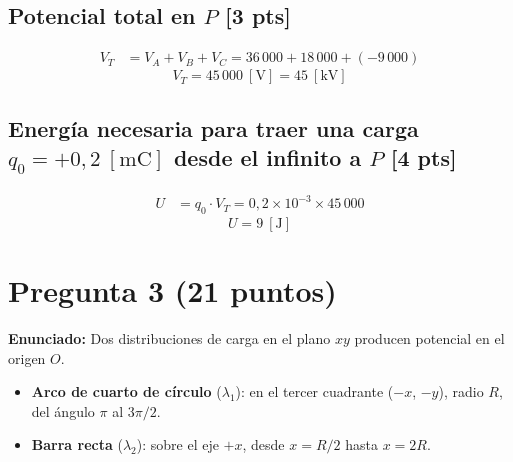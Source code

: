 \documentclass[12pt,letterpaper]{article}
\begin{document}
\subsection*{Potencial total en $P$ \hfill \normalfont\small[3 pts]}

\begin{align*}
    V_T &= V_A + V_B + V_C = 36\,000 + 18\,000 + (-9\,000)
\end{align*}
\[
    \boxed{V_T = 45\,000\ [\text{V}] = 45\ [\text{kV}]}
\]

\subsection*{Energ\'ia necesaria para traer una carga $q_0 = +0{,}2\ [\text{mC}]$ desde el infinito a $P$ \hfill \normalfont\small[4 pts]}

\begin{align*}
    U &= q_0\cdot V_T
      = 0{,}2\times10^{-3}\times 45\,000
\end{align*}
\[
    \boxed{U = 9\ [\text{J}]}
\]

\newpage

\section*{Pregunta 3 \hfill \normalfont\small(21 puntos)}

\noindent\textbf{Enunciado:} Dos distribuciones de carga en el plano $xy$ producen potencial en el origen $O$.

\begin{itemize}
    \item \textbf{Arco de cuarto de c\'irculo} ($\lambda_1$): en el tercer cuadrante ($-x$, $-y$), radio $R$, del \'angulo $\pi$ al $3\pi/2$.
    \item \textbf{Barra recta} ($\lambda_2$): sobre el eje $+x$, desde $x = R/2$ hasta $x = 2R$.
\end{itemize}
\end{document}
